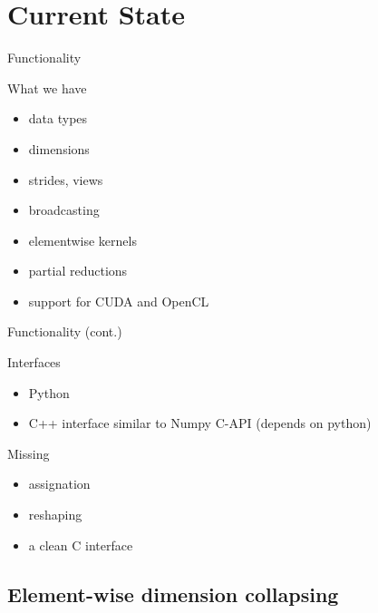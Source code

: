 \documentclass[utf8x,xcolor=pdftex,dvipsnames,table]{beamer}
\begin{document}
\section{Current State}

\begin{frame}{Functionality}
\begin{block}{What we have}
\begin{itemize}
\item data types
\item dimensions
\item strides, views
\item broadcasting
\item elementwise kernels
\item partial reductions
\item support for CUDA and OpenCL
\end{itemize}
\end{block}
\end{frame}

\begin{frame}{Functionality (cont.)}
\begin{block}{Interfaces}
\begin{itemize}
\item Python
\item C++ interface similar to Numpy C-API (depends on python)
\end{itemize}
\end{block}
\begin{block}{Missing}
\begin{itemize}
\item assignation
\item reshaping
\item a clean C interface
\end{itemize}
\end{block}
\end{frame}

\subsection{Element-wise dimension collapsing}
\end{document}
